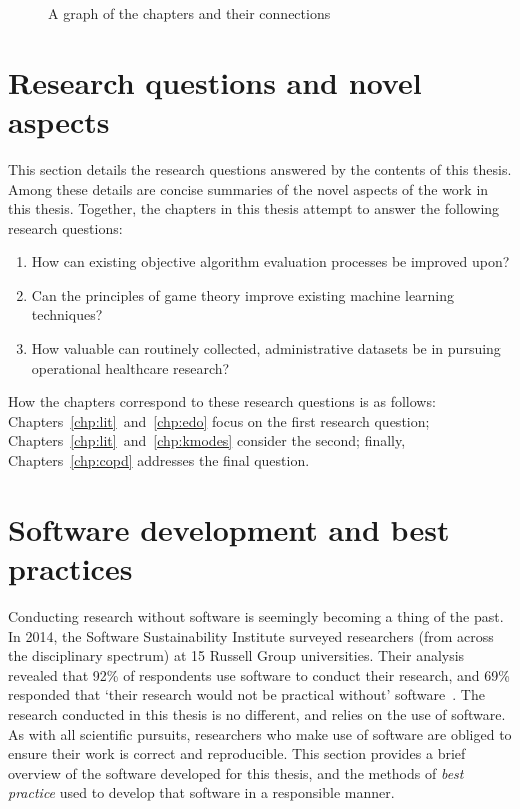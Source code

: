 \begin{figure}[htbp]
    \centering%
    \resizebox{\imgwidth}{!}{%
    
    }
    \caption{A graph of the chapters and their connections}\label{fig:structure}
\end{figure}


\section{Research questions and novel aspects}\label{sec:questions}

This section details the research questions answered by the contents of this
thesis. Among these details are concise summaries of the novel aspects of the
work in this thesis. Together, the chapters in this thesis attempt to answer
the following research questions:

\begin{enumerate}
    \item How can existing objective algorithm evaluation processes be improved
        upon?
    \item Can the principles of game theory improve existing machine learning
        techniques?
    \item How valuable can routinely collected, administrative datasets be in
        pursuing operational healthcare research?
\end{enumerate}

How the chapters correspond to these research questions is as follows:
Chapters~\ref{chp:lit}~and~\ref{chp:edo} focus on the first research question;
Chapters~\ref{chp:lit}~and~\ref{chp:kmodes} consider the second; finally,
Chapters~\ref{chp:copd} addresses the final question.


\section{Software development and best practices}\label{sec:dev}

Conducting research without software is seemingly becoming a thing of the past.
In 2014, the Software Sustainability Institute surveyed researchers (from across
the disciplinary spectrum) at 15 Russell Group universities. Their analysis
revealed that 92\% of respondents use software to conduct their research, and
69\% responded that `their research would not be practical without'
software~\cite{Hettrick2014}. The research conducted in this thesis is no
different, and relies on the use of software. As with all scientific pursuits,
researchers who make use of software are obliged to ensure their work is correct
and reproducible. This section provides a brief overview of the software
developed for this thesis, and the methods of \emph{best practice} used to
develop that software in a responsible manner.

